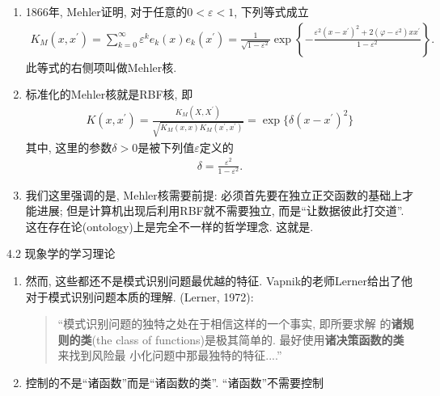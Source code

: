 \documentclass[compress,10pt,dvipsnames,notheorems]{beamer} %
\begin{document}
\begin{frame}
\begin{enumerate}
\item 1866年, Mehler证明, 对于任意的$0 < \varepsilon < 1$, 下列等式成立
\begin{align*}
K_{M}(x,x^{\prime}) = \sum_{k=0}^{\infty}\varepsilon^{k}e_{k}(x)e_{k}(x^{\prime}) = \frac{1}{\sqrt{1-\varepsilon^{2}}}\exp \left\{ -\frac{\varepsilon^{2}(x-x^{\prime})^{2} + 2(\varphi - \varepsilon^{2})xx^{\prime}}{1-\varepsilon^{2}} \right\}.
\end{align*}
此等式的右侧项叫做\textsf{Mehler核}. 
\item 标准化的Mehler核就是RBF核, 即
\begin{align*}
K(x,x^{\prime}) = \frac{K_{M}(X,X^{\prime})}{\sqrt{K_{M}(x,x)K_{M}(x^{\prime},x^{\prime})}} = \exp\{\delta(x-x^{\prime})^{2}\}
\end{align*}
其中, 这里的参数$\delta > 0$是被下列值$\varepsilon$定义的
\begin{align*}
\delta = \frac{\varepsilon^{2}}{1-\varepsilon^{2}}.
\end{align*}
\item 我们这里强调的是, Mehler核需要前提: 必须首先要在独立正交函数的基础上才能进展; 但是计算机出现后利用RBF就不需要独立, 而是“让数据彼此打交道”. 这在存在论(ontology)上是完全不一样的哲学理念. 这就是{\color{red}{现象学还原的方法对先前的理论做扬弃}}.
\end{enumerate}
\end{frame}

\begin{frame}{4.2 现象学的学习理论}
\begin{enumerate}
\item 然而, 这些都还不是模式识别问题最优越的特征. Vapnik的老师Lerner给出了他对于模式识别问题本质的理解. (Lerner, 1972):

\begin{quotation}
“模式识别问题的独特之处在于相信这样的一个事实, 即所要求解
的\textbf{诸规则的类}(the class of functions)是极其简单的. 最好使用\textbf{诸决策函数的类}来找到风险最
小化问题中那最独特的特征....”
\end{quotation}
\item 控制的不是“诸函数”而是“诸函数的类”. “诸函数”不需要控制
\end{enumerate}
\end{frame}
\end{document}
